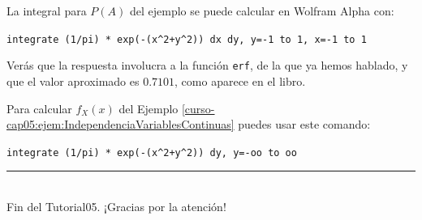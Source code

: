 \documentclass[10pt,a4paper]{article}\usepackage[]{graphicx}\usepackage[]{color}
\newcounter{cont01}
\begin{document}
La integral para $P(A)$ del ejemplo se puede calcular en Wolfram Alpha con:
\begin{center}
\verb#integrate (1/pi) * exp(-(x^2+y^2)) dx dy, y=-1 to 1, x=-1 to 1#
\end{center}
Verás que la respuesta involucra a la función {\tt erf}, de la que ya hemos hablado, y que el valor aproximado es $0.7101$, como aparece en el libro.

Para calcular $f_X(x)$ del Ejemplo \ref{curso-cap05:ejem:IndependenciaVariablesContinuas} puedes usar este comando:
\begin{center}
\verb#integrate (1/pi) * exp(-(x^2+y^2)) dy, y=-oo to oo#
\end{center}

\vspace{2cm} \hrule
\quad\\
Fin del Tutorial05. ¡Gracias por la atención!

%
\end{document}
